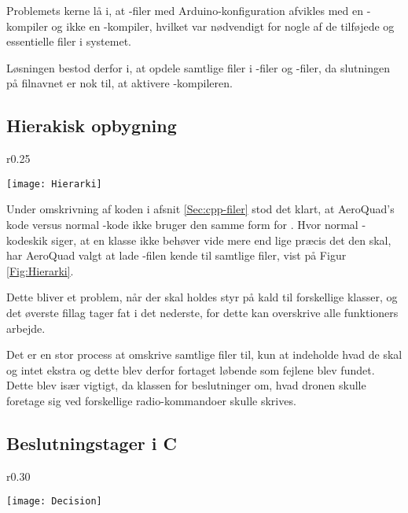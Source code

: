 \documentclass[Main]{subfiles}
\begin{document}
Problemets kerne lå i, at -filer med Arduino-konfiguration afvikles med en -kompiler og ikke en -kompiler, hvilket var nødvendigt for nogle af de tilføjede og essentielle filer i systemet.

Løsningen bestod derfor i, at opdele samtlige filer i -filer og -filer, da slutningen på filnavnet er nok til, at aktivere -kompileren.



\subsection{Hierakisk opbygning}

\begin{wrapfigure}{r}{0.25\textwidth}
  \vspace{-20pt}
  \begin{center}
	\texttt{[image: Hierarki]}
  \end{center}
  \vspace{-20pt}
  \caption{AeroQuad's opbygning.}
  \label{Fig:Hierarki}
  \vspace{-20pt}
\end{wrapfigure}

Under omskrivning af koden i afsnit \ref{Sec:cpp-filer} stod det klart, at Aero\-Quad's kode versus normal -kode ikke bruger den samme form for .
Hvor normal -kodeskik siger, at en klasse ikke behøver vide mere end lige præcis det den skal, har AeroQuad valgt at lade -filen kende til samtlige filer, vist på Figur \ref{Fig:Hierarki}.

Dette bliver et problem, når der skal holdes styr på kald til forskellige klasser, og det øverste fillag tager fat i det nederste, for dette kan overskrive alle funktioners arbejde.

Det er en stor process at omskrive samtlige filer til, kun at indeholde hvad de skal og intet ekstra og dette blev derfor fortaget løbende som fejlene blev fundet.
Dette blev især vigtigt, da klassen for beslutninger om, hvad dronen skulle foretage sig ved forskellige radio-kommandoer skulle skrives.


\subsection{Beslutningstager i C}
\begin{wrapfigure}{r}{0.30\textwidth}
  \begin{center}
	\texttt{[image: Decision]}
  \end{center}
  \vspace{-20pt}
  \caption{Beslutningstagning.}
  \label{Fig:Decision}
  \vspace{-10pt}
\end{wrapfigure}
\end{document}
